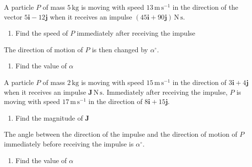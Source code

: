\documentclass[leqno]{article}
\begin{document}
\djsFrontMatter
\begin{enumerate}[
  label=\textbf{\arabic*.},
  leftmargin=*,
  topsep=0pt,
  partopsep=0pt,
  parsep=0pt
]


\questionitem

A particle $P$ of mass $5\,\mathrm{kg}$ is moving with speed $13\,\mathrm{m\,s^{-1}}$ in the direction of the vector $5\mathbf{i}-12\mathbf{j}$ when it receives an impulse $(45\mathbf{i}+90\mathbf{j})\,\mathrm{N\,s}$. \\

\begin{enumerate}[label=\textbf{(\alph*)}]
  \item Find the speed of $P$ immediately after receiving the impulse  \\
\end{enumerate}
The direction of motion of $P$ is then changed by $\alpha^\circ$. \\
\begin{enumerate}[label=\textbf{(\alph*)}, resume]
  \item Find the value of $\alpha$  \\
\end{enumerate}

\newpage

\questionitem

A particle $P$ of mass $2\,\mathrm{kg}$ is moving with speed $15\,\mathrm{m\,s^{-1}}$ in the direction of $3\mathbf{i}+4\mathbf{j}$ when it receives an impulse $\mathbf{J}\,\mathrm{N\,s}$. Immediately after receiving the impulse, $P$ is moving with speed $17\,\mathrm{m\,s^{-1}}$ in the direction of $8\mathbf{i}+15\mathbf{j}$. \\

\begin{enumerate}[label=\textbf{(\alph*)}]
  \item Find the magnitude of $\mathbf{J}$  \\
\end{enumerate}
The angle between the direction of the impulse and the direction of motion of $P$ immediately before receiving the impulse is $\alpha^\circ$. \\
\begin{enumerate}[label=\textbf{(\alph*)}, resume]
  \item Find the value of $\alpha$  \\
\end{enumerate}


\end{enumerate}
\end{document}
